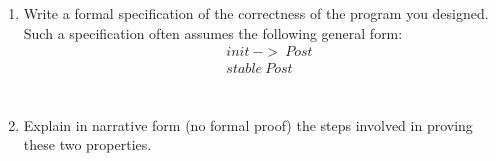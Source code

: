 \documentclass{article}
\begin{document}
\begin{enumerate}
\item
Write a formal specification of the correctness of the program you designed. Such a specification often assumes the following general form:\\
\begin{align*}
&init \ -> \ Post\\
&stable \ Post\\
\end{align*}
\\
\item
Explain in narrative form (no formal proof) the steps involved in proving these two properties.\\
\end{enumerate}
\end{document}
